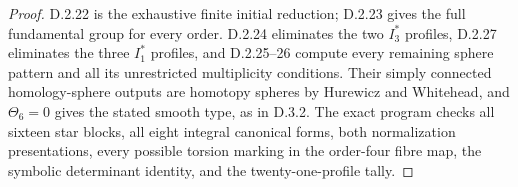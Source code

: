 \begin{proof}
D.2.22 is the exhaustive finite initial reduction; D.2.23 gives
the full fundamental group for every order. D.2.24 eliminates
the two $I_3^*$ profiles, D.2.27 eliminates the three $I_1^*$
profiles, and D.2.25--26 compute every remaining sphere pattern
and all its unrestricted multiplicity conditions. Their
simply connected homology-sphere outputs are homotopy spheres
by Hurewicz and Whitehead, and $\Theta_6=0$ gives the stated
smooth type, as in D.3.2. The exact program
 checks all sixteen
star blocks, all eight integral canonical forms, both
normalization presentations, every possible torsion marking
in the order-four fibre map, the symbolic determinant identity,
and the twenty-one-profile tally.
\end{proof}

